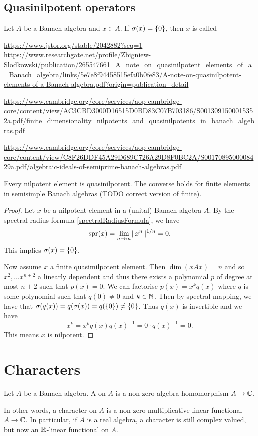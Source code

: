 \subsection{Quasinilpotent operators}
\begin{definition}
Let $A$ be a Banach algebra and $x\in A$. If $\sigma(x) = \{0\}$, then $x$ is called 
\end{definition}
\url{https://www.jstor.org/stable/2042882?seq=1}
\url{https://www.researchgate.net/profile/Zbigniew-Slodkowski/publication/265547661_A_note_on_quasinilpotent_elements_of_a_Banach_algebra/links/5e7e8f94458515efa0b0fe83/A-note-on-quasinilpotent-elements-of-a-Banach-algebra.pdf?origin=publication_detail}

\url{https://www.cambridge.org/core/services/aop-cambridge-core/content/view/AC3CBD3000D16515D0BD83C07B703186/S0013091500015352a.pdf/finite_dimensionality_nilpotents_and_quasinilpotents_in_banach_algebras.pdf}

\url{https://www.cambridge.org/core/services/aop-cambridge-core/content/view/C8F26DDF45A29D689C726A29D8F0BC2A/S0017089500008429a.pdf/algebraic-ideals-of-semiprime-banach-algebras.pdf}

\begin{proposition} \label{nilpotentQuasinilpotent}
Every nilpotent element is quasinilpotent. The converse holds for finite elements in semisimple Banach algebras (TODO correct version of finite).
\end{proposition}
\begin{proof}
Let $x$ be a nilpotent element in a (unital) Banach algebra $A$.
By the spectral radius formula \ref{spectralRadiusFormula}, we have
\[ \operatorname{spr}(x) = \lim_{n\to\infty}\lVert x^n\rVert^{1/n} = 0. \]
This implies $\sigma(x) = \{0\}$.

Now assume $x$ a finite quasimilpotent element. Then $\dim(xAx) = n$ and so $x^2, \ldots x^{n+2}$ a linearly dependent and thus there exists a polynomial $p$ of degree at most $n+2$ such that $p(x) = 0$. We can factorise $p(x) = x^kq(x)$ where $q$ is some polynomial such that $q(0) \neq 0$ and $k\in \mathbb{N}$. Then by spectral mapping, we have that $\sigma(q(x)) = q(\sigma(x)) = q(\{0\}) \neq \{0\}$. Thus $q(x)$ is invertible and we have
\[ x^k = x^kq(x)q(x)^{-1} = 0\cdot q(x)^{-1} = 0. \]
This means $x$ is nilpotent.
\end{proof}

\section{Characters}
\begin{definition}
Let $A$ be a Banach algebra. A  on $A$ is a non-zero algebra homomorphism $A\to\mathbb{C}$.
\end{definition}
In other words, a character on $A$ is a non-zero multiplicative linear functional $A\to \mathbb{C}$.
In particular, if $A$ is a real algebra, a character is still complex valued, but now  an $\mathbb{R}$-linear functional on $A$. 

